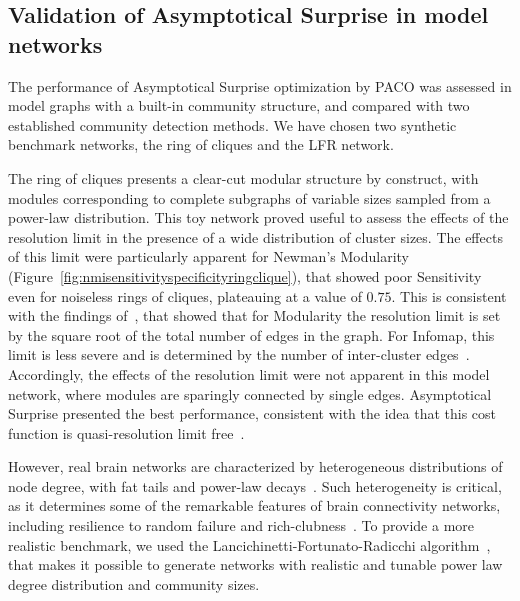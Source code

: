 \subsection{Validation of Asymptotical Surprise in model networks}
The performance of Asymptotical Surprise optimization by PACO was assessed in model graphs with a built-in community structure, and compared with two established community detection methods. We have chosen two synthetic benchmark networks, the ring of cliques and the LFR network.

The ring of cliques presents a clear-cut modular structure by construct, with modules corresponding to complete subgraphs of variable sizes sampled from a power-law distribution. 
This toy network proved useful to assess the effects of the resolution limit in the presence of a wide distribution of cluster sizes. The effects of this limit were particularly apparent for Newman's Modularity (Figure~\ref{fig:nmisensitivityspecificityringclique}), that showed poor Sensitivity even for noiseless rings of cliques, plateauing at a value of $0.75$.
This is consistent with the findings of~\cite{fortunato2007}, that showed that for Modularity the resolution limit is set by the square root of the total number of edges in the graph.
For Infomap, this limit is less severe and is determined by the number of inter-cluster edges~\cite{kawamoto2015}. Accordingly, the effects of the resolution limit were not apparent in this model network, where modules are sparingly connected by single edges.
Asymptotical Surprise presented the best performance, consistent with the idea that this cost function is quasi-resolution limit free~\cite{traag2015}.

However, real brain networks are characterized by heterogeneous distributions of node degree, with fat tails and power-law decays~\cite{bullmore2009}. Such heterogeneity is critical, as it determines some of the remarkable features of brain connectivity networks, including resilience to random failure and rich-clubness~\cite{vandenheuvel2011,vandenheuvel2013a}. To provide a more realistic benchmark, we used the Lancichinetti-Fortunato-Radicchi algorithm~\cite{lancichinetti2008}, that makes it possible to generate networks with realistic and tunable power law degree distribution and community sizes.


